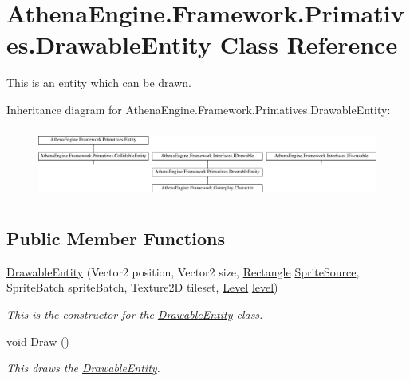 \hypertarget{class_athena_engine_1_1_framework_1_1_primatives_1_1_drawable_entity}{\section{Athena\-Engine.\-Framework.\-Primatives.\-Drawable\-Entity Class Reference}
\label{class_athena_engine_1_1_framework_1_1_primatives_1_1_drawable_entity}
}


This is an entity which can be drawn.  


Inheritance diagram for Athena\-Engine.\-Framework.\-Primatives.\-Drawable\-Entity\-:\begin{figure}[H]
\begin{center}
\leavevmode
\includegraphics[height=2.340648cm]{class_athena_engine_1_1_framework_1_1_primatives_1_1_drawable_entity}
\end{center}
\end{figure}
\subsection*{Public Member Functions}
\begin{DoxyCompactItemize}
\item 
\hyperlink{class_athena_engine_1_1_framework_1_1_primatives_1_1_drawable_entity_ae26ce0ed37e50a9f15fc9f2260961712}{Drawable\-Entity} (Vector2 position, Vector2 size, \hyperlink{class_athena_engine_1_1_framework_1_1_primatives_1_1_entity_a7d7668b0626f6b13a6926fea2ce06750}{Rectangle} \hyperlink{class_athena_engine_1_1_framework_1_1_primatives_1_1_drawable_entity_a27c0d8c1dd1000a454cff027372edb64}{Sprite\-Source}, Sprite\-Batch sprite\-Batch, Texture2\-D tileset, \hyperlink{class_athena_engine_1_1_framework_1_1_gameplay_1_1_level}{Level} \hyperlink{class_athena_engine_1_1_framework_1_1_primatives_1_1_drawable_entity_a8c9db75b5a1d3222ebe2597f760ff8e1}{level})
\begin{DoxyCompactList}\small\item\em This is the constructor for the \hyperlink{class_athena_engine_1_1_framework_1_1_primatives_1_1_drawable_entity}{Drawable\-Entity} class. \end{DoxyCompactList}\item 
void \hyperlink{class_athena_engine_1_1_framework_1_1_primatives_1_1_drawable_entity_aae129a4b87e1cd288b535e6cf5dbcfaa}{Draw} ()
\begin{DoxyCompactList}\small\item\em This draws the \hyperlink{class_athena_engine_1_1_framework_1_1_primatives_1_1_drawable_entity}{Drawable\-Entity}. \end{DoxyCompactList}\end{DoxyCompactItemize}
